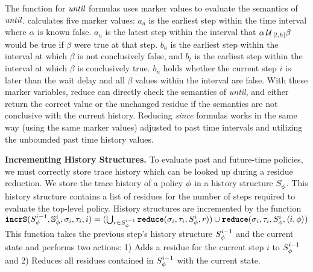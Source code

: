 The \reduce function for $\emph{until}$ formulas uses marker values to evaluate the semantics of $\emph{until}$. \reduce calculates five marker values: $a_a$ is the earliest step within the time interval where $\alpha$ is known false. $a_u$ is the latest step within the interval that $\alpha \until_{[l,h]} \beta$ would be true if $\beta$ were true at that step. $b_a$ is the earliest step within the interval at which $\beta$ is not conclusively false, and $b_t$ is the earliest step within the interval at which $\beta$ is conclusively true. $b_n$ holds whether the current step $i$ is later than the wait delay and all $\beta$ values within the interval are false. With these marker variables, reduce can directly check the semantics of \emph{until}, and either return the correct value or the unchanged residue if the semantics are not conclusive with the current history. Reducing \emph{since} formulas works in the same way (using the same marker values) adjusted to past time intervals and utilizing the unbounded past time history values.


\textbf{Incrementing History Structures.}
To evaluate past and future-time policies, we must correctly store trace history which can be looked up during a residue reduction. 
We store the trace history of a policy $\policyv$ in a history structure $\histst[\policyv]{}$. 
This history structure contains a list of residues for the number of steps required to evaluate the top-level policy. History structures are incremented by the function 
$\incrS(\histst[\policyv]{i-1}, \histSt[\policyv]{i}, \sigma_i, \tau_i, i) = (\bigcup_{r \in \histst[\policyv]{i-1}} \reduce(\sigma_i, \tau_i, \histst[\policyv]{i}, r)) \cup \reduce(\sigma_i, \tau_i, \histst[\policyv]{i}, \rp{i}{\policyv})$
%
This function takes the previous step's history structure $\histst[\policyv]{i-1}$ and the current state 
and performs two actions:
	1) Adds a residue for the current step $i$ to $\histst[\policyv]{i-1}$ and
	2) Reduces all residues contained in $\histst[\policyv]{i-1}$ with the current state.


